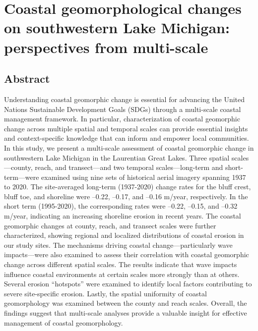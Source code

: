 \chapter{Coastal geomorphological changes on southwestern Lake Michigan:
perspectives from multi-scale} 
\label{Chapter2}

\section{Abstract}
\label{c2_Abstract}

Understanding coastal geomorphic change is essential for advancing the United
Nations Sustainable Development Goals (SDGs) through a multi-scale coastal
management framework. In particular, characterization of coastal geomorphic
change across multiple spatial and temporal scales can provide essential
insights and context-specific knowledge that can inform and empower local
communities. In this study, we present a multi-scale assessment of coastal
geomorphic change in southwestern Lake Michigan in the Laurentian Great Lakes.
Three spatial scales—county, reach, and transect—and two temporal
scales—long-term and short-term—were examined using nine sets of historical
aerial imagery spanning 1937 to 2020. The site-averaged long-term (1937-2020)
change rates for the bluff crest, bluff toe, and shoreline were –0.22, –0.17,
and –0.16 m/year, respectively. In the short term (1995-2020), the corresponding
rates were –0.22, –0.15, and –0.32 m/year, indicating an increasing shoreline
erosion in recent years. The coastal geomorphic changes at county, reach, and
transect scales were further characterized, showing regional and localized
distributions of coastal erosion in our study sites. The mechanisms driving
coastal change—particularly wave impacts—were also examined to assess their
correlation with coastal geomorphic change across different spatial scales. The
results indicate that wave impacts influence coastal environments at certain
scales more strongly than at others. Several erosion “hotspots” were examined to
identify local factors contributing to severe site-specific erosion. Lastly, the
spatial uniformity of coastal geomorphology was examined between the county and
reach scales. Overall, the findings suggest that multi-scale analyses provide a
valuable insight for effective management of coastal geomorphology.

